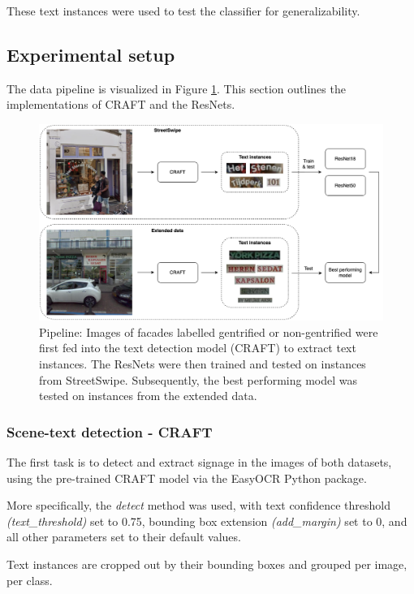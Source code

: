 These text instances were used to test the classifier for generalizability.


\subsection{Experimental setup}

The data pipeline is visualized in Figure \ref{fig:pipeline}. This section outlines the implementations of CRAFT and the ResNets.

\begin{figure}[]
    \centering
    \includegraphics[width=\textwidth]{media/methodology/Pipeline.png}
    \caption{Pipeline: Images of facades labelled gentrified or non-gentrified were first fed into the text detection model (CRAFT) to extract text instances. The ResNets were then trained and tested on instances from StreetSwipe. Subsequently, the best performing model was tested on instances from the extended data.}
    \label{fig:pipeline}
\end{figure}


\subsubsection{Scene-text detection - CRAFT}

The first task is to detect and extract signage in the images of both datasets, using the pre-trained CRAFT model via the EasyOCR Python package.

More specifically, the \textit{detect} method was used, with text confidence threshold \textit{(text\_threshold)} set to 0.75, bounding box extension \textit{(add\_margin)} set to 0, and all other parameters set to their default values.

Text instances are cropped out by their bounding boxes and grouped per image, per class. 


